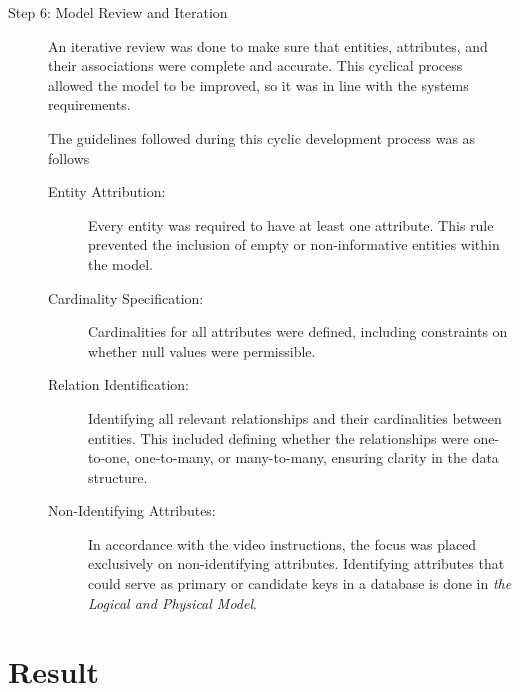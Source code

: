 \documentclass[a4paper]{scrartcl}
\begin{document}
\begin{description}
\item[Step 6: Model Review and Iteration]
  An iterative review was done to make sure that entities, attributes, and their
  associations were complete and accurate. This cyclical process allowed the
  model to be improved, so it was in line with the systems requirements.
  
  The guidelines followed during this cyclic development process was as follows
  \begin{description}
    \item[Entity Attribution:]
    Every entity was required to have at least one attribute. This rule
    prevented the inclusion of empty or non-informative entities within the
    model.

    \item[Cardinality Specification:]
    Cardinalities for all attributes were defined, including constraints on
    whether null values were permissible. 

    \item[Relation Identification:]
    Identifying all relevant relationships and their cardinalities between
    entities. This included defining whether the relationships were one-to-one,
    one-to-many, or many-to-many, ensuring clarity in the data structure.

    \item[Non-Identifying Attributes:]
    In accordance with the video instructions, the focus was placed exclusively
    on non-identifying attributes. Identifying attributes that could serve as
    primary or candidate keys in a database is done in
    \emph{the Logical and Physical Model}.
  \end{description}
\end{description}

\pagebreak
\section{Result}


\end{document}
